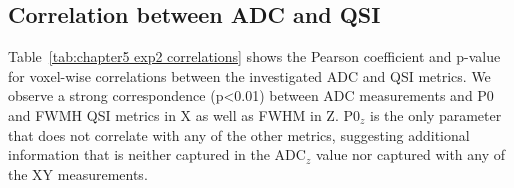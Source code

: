 \begin{table}
{        \label{tab:chap5exp2_qsiz hotelling}%
  }\hspace{0.2cm}
  \label{tab:chapter6 hotelling}%
\end{table}%

\subsection*{Correlation between ADC and QSI}
\label{par:chapter5 exp2 correlation}
Table~\ref{tab:chapter5 exp2 correlations} shows the Pearson coefficient and p-value for voxel-wise correlations between the investigated ADC and QSI metrics. We observe a strong correspondence (p<0.01) between ADC measurements and P0 and FWMH QSI metrics in X as well as FWHM in Z. P0$_z$ is the only parameter that does not correlate with any of the other metrics, suggesting additional information that is neither captured in the ADC$_z$ value nor captured with any of the XY measurements.%

